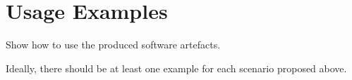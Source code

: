 \section{Usage Examples}

Show how to use the produced software artefacts.

Ideally, there should be at least one example for each scenario proposed above.
